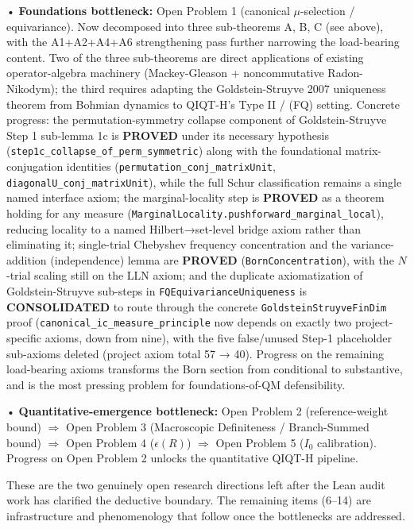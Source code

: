 \documentclass[11pt,a4paper]{article}
\begin{document}
  • \textbf{Foundations bottleneck:} Open Problem 1 (canonical $\mu$-selection / equivariance). Now decomposed into three sub-theorems A, B, C (see above), with the A1+A2+A4+A6 strengthening pass further narrowing the load-bearing content. Two of the three sub-theorems are direct applications of existing operator-algebra machinery (Mackey-Gleason + noncommutative Radon-Nikodym); the third requires adapting the Goldstein-Struyve 2007 uniqueness theorem from Bohmian dynamics to QIQT-H's Type II / (FQ) setting. Concrete progress: the permutation-symmetry collapse component of Goldstein-Struyve Step 1 sub-lemma 1c is \textbf{PROVED} under its necessary hypothesis (\texttt{step1c\_collapse\_of\_perm\_symmetric}) along with the foundational matrix-conjugation identities (\texttt{permutation\_conj\_matrixUnit}, \texttt{diagonalU\_conj\_matrixUnit}), while the full Schur classification remains a single named interface axiom; the marginal-locality step is \textbf{PROVED} as a theorem holding for any measure (\texttt{MarginalLocality.pushforward\_marginal\_local}), reducing locality to a named Hilbert→set-level bridge axiom rather than eliminating it; single-trial Chebyshev frequency concentration and the variance-addition (independence) lemma are \textbf{PROVED} (\texttt{BornConcentration}), with the $N$-trial scaling still on the LLN axiom; and the duplicate axiomatization of Goldstein-Struyve sub-steps in \texttt{FQEquivarianceUniqueness} is \textbf{CONSOLIDATED} to route through the concrete \texttt{GoldsteinStruyveFinDim} proof (\texttt{canonical\_ic\_measure\_principle} now depends on exactly two project-specific axioms, down from nine), with the five false/unused Step-1 placeholder sub-axioms deleted (project axiom total 57 → 40). Progress on the remaining load-bearing axioms transforms the Born section from conditional to substantive, and is the most pressing problem for foundations-of-QM defensibility.

  • \textbf{Quantitative-emergence bottleneck:} Open Problem 2 (reference-weight bound) $\Rightarrow$ Open Problem 3 (Macroscopic Definiteness / Branch-Summed bound) $\Rightarrow$ Open Problem 4 ($\epsilon(R)$) $\Rightarrow$ Open Problem 5 ($I_0$ calibration). Progress on Open Problem 2 unlocks the quantitative QIQT-H pipeline.

These are the two genuinely open research directions left after the Lean audit work has clarified the deductive boundary. The remaining items (6–14) are infrastructure and phenomenology that follow once the bottlenecks are addressed.
\end{document}
